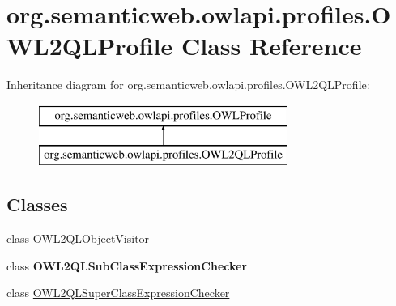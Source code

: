 \hypertarget{classorg_1_1semanticweb_1_1owlapi_1_1profiles_1_1_o_w_l2_q_l_profile}{\section{org.\-semanticweb.\-owlapi.\-profiles.\-O\-W\-L2\-Q\-L\-Profile Class Reference}
\label{classorg_1_1semanticweb_1_1owlapi_1_1profiles_1_1_o_w_l2_q_l_profile}
}
Inheritance diagram for org.\-semanticweb.\-owlapi.\-profiles.\-O\-W\-L2\-Q\-L\-Profile\-:\begin{figure}[H]
\begin{center}
\leavevmode
\includegraphics[height=2.000000cm]{classorg_1_1semanticweb_1_1owlapi_1_1profiles_1_1_o_w_l2_q_l_profile}
\end{center}
\end{figure}
\subsection*{Classes}
\begin{DoxyCompactItemize}
\item 
class \hyperlink{classorg_1_1semanticweb_1_1owlapi_1_1profiles_1_1_o_w_l2_q_l_profile_1_1_o_w_l2_q_l_object_visitor}{O\-W\-L2\-Q\-L\-Object\-Visitor}
\item 
class {\bfseries O\-W\-L2\-Q\-L\-Sub\-Class\-Expression\-Checker}
\item 
class \hyperlink{classorg_1_1semanticweb_1_1owlapi_1_1profiles_1_1_o_w_l2_q_l_profile_1_1_o_w_l2_q_l_super_class_expression_checker}{O\-W\-L2\-Q\-L\-Super\-Class\-Expression\-Checker}
\end{DoxyCompactItemize}
